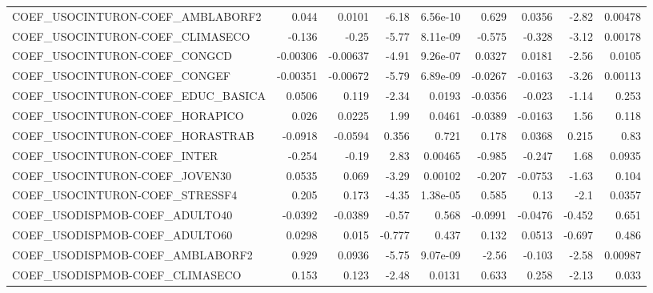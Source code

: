 \begin{tabular}{lrrrrrrrr}
COEF\_USOCINTURON-COEF\_AMBLABORF2      &       0.044 &       0.0101 &    -6.18 & 6.56e-10 &      0.629 &      0.0356 &        -2.82 &       0.00478 \\
COEF\_USOCINTURON-COEF\_CLIMASECO       &      -0.136 &        -0.25 &    -5.77 & 8.11e-09 &     -0.575 &      -0.328 &        -3.12 &       0.00178 \\
COEF\_USOCINTURON-COEF\_CONGCD          &    -0.00306 &     -0.00637 &    -4.91 & 9.26e-07 &     0.0327 &      0.0181 &        -2.56 &        0.0105 \\
COEF\_USOCINTURON-COEF\_CONGEF          &    -0.00351 &     -0.00672 &    -5.79 & 6.89e-09 &    -0.0267 &     -0.0163 &        -3.26 &       0.00113 \\
COEF\_USOCINTURON-COEF\_EDUC\_BASICA     &      0.0506 &        0.119 &    -2.34 &   0.0193 &    -0.0356 &      -0.023 &        -1.14 &         0.253 \\
COEF\_USOCINTURON-COEF\_HORAPICO        &       0.026 &       0.0225 &     1.99 &   0.0461 &    -0.0389 &     -0.0163 &         1.56 &         0.118 \\
COEF\_USOCINTURON-COEF\_HORASTRAB       &     -0.0918 &      -0.0594 &    0.356 &    0.721 &      0.178 &      0.0368 &        0.215 &          0.83 \\
COEF\_USOCINTURON-COEF\_INTER           &      -0.254 &        -0.19 &     2.83 &  0.00465 &     -0.985 &      -0.247 &         1.68 &        0.0935 \\
COEF\_USOCINTURON-COEF\_JOVEN30         &      0.0535 &        0.069 &    -3.29 &  0.00102 &     -0.207 &     -0.0753 &        -1.63 &         0.104 \\
COEF\_USOCINTURON-COEF\_STRESSF4        &       0.205 &        0.173 &    -4.35 & 1.38e-05 &      0.585 &        0.13 &         -2.1 &        0.0357 \\
COEF\_USODISPMOB-COEF\_ADULTO40         &     -0.0392 &      -0.0389 &    -0.57 &    0.568 &    -0.0991 &     -0.0476 &       -0.452 &         0.651 \\
COEF\_USODISPMOB-COEF\_ADULTO60         &      0.0298 &        0.015 &   -0.777 &    0.437 &      0.132 &      0.0513 &       -0.697 &         0.486 \\
COEF\_USODISPMOB-COEF\_AMBLABORF2       &       0.929 &       0.0936 &    -5.75 & 9.07e-09 &      -2.56 &      -0.103 &        -2.58 &       0.00987 \\
COEF\_USODISPMOB-COEF\_CLIMASECO        &       0.153 &        0.123 &    -2.48 &   0.0131 &      0.633 &       0.258 &        -2.13 &         0.033 \\

\end{tabular}
